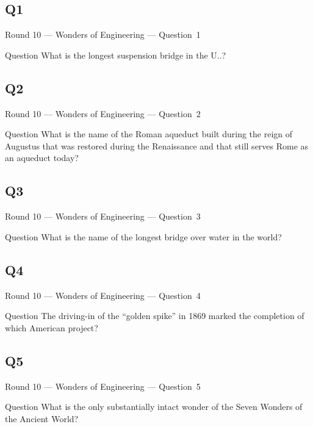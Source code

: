 \documentclass[11pt]{beamer}
\begin{document}
\subsection*{Q1}
\begin{frame}[t]{Round 10 --- Wonders of Engineering --- \mbox{Question 1}}
\vspace{-0.5em}
\begin{block}{Question}
What is the longest suspension bridge in the U.\@S.\@?
\end{block}
\end{frame}
\subsection*{Q2}
\begin{frame}[t]{Round 10 --- Wonders of Engineering --- \mbox{Question 2}}
\vspace{-0.5em}
\begin{block}{Question}
What is the name of the Roman aqueduct built during the reign of Augustus that was restored during the Renaissance and that still serves Rome as an aqueduct today?
\end{block}
\end{frame}
\subsection*{Q3}
\begin{frame}[t]{Round 10 --- Wonders of Engineering --- \mbox{Question 3}}
\vspace{-0.5em}
\begin{block}{Question}
What is the name of the longest bridge over water in the world?
\end{block}
\end{frame}
\subsection*{Q4}
\begin{frame}[t]{Round 10 --- Wonders of Engineering --- \mbox{Question 4}}
\vspace{-0.5em}
\begin{block}{Question}
The driving-in of the ``golden spike'' in 1869 marked the completion of which American project?
\end{block}
\end{frame}
\subsection*{Q5}
\begin{frame}[t]{Round 10 --- Wonders of Engineering --- \mbox{Question 5}}
\vspace{-0.5em}
\begin{block}{Question}
What is the only substantially intact wonder of the Seven Wonders of the Ancient World?
\end{block}
\end{frame}
\end{document}
